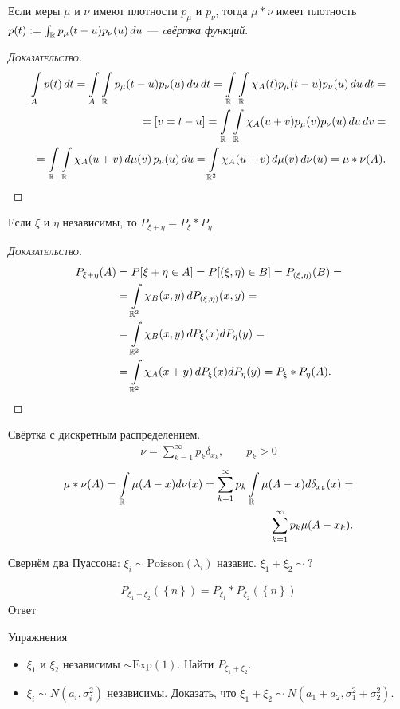 \begin{thm}
 Если меры $ \mu $ и $ \nu $ имеют плотности $ p_{\mu} $ и $ p_{\nu} $, тогда $ \mu \ast \nu $ имеет плотность $ p(t) := \int_{\mathbb{R}} p_{\mu}(t-u)p_{\nu}(u)\,du  $ --- \textit{cвёртка функций}.
\end{thm}
\begin{proof}[\normalfont\textsc{Доказательство}]
 \begin{align*}
  \int\limits_{A} p(t)\,dt = \int\limits_{A} \int\limits_{\mathbb{R}} p_{\mu}(t-u)p_{\nu}(u)\,du\,dt = \int\limits_{\mathbb{R}} \int\limits_{\mathbb{R}} \chi_A(t)p_{\mu} (t-u)p_{\nu}(u)\,du\,dt = \\
  = [v = t - u] = \int\limits_{\mathbb{R}} \int\limits_{\mathbb{R}} \chi_{A}(u+v) p_{\mu}(v) p_{\nu}(u) \, du\,dv = \\
  = \int\limits_{\mathbb{R}} \int\limits_{\mathbb{R}} \chi_A(u+v)\,d\mu(v)\,p_{\nu}(u)\,du = \int\limits_{\mathbb{R}^{2}} \chi_A(u+v)\,d\mu(v)\,d\nu(u) = \mu \ast \nu(A).   
 \end{align*} 
\end{proof}

\begin{thm}
 Если $ \xi $ и $ \eta $ независимы, то $ P_{\xi + \eta} = P_\xi \ast P_\eta $.
\end{thm}
\begin{proof}[\normalfont\textsc{Доказательство}]
 \begin{align*}
  P_{\xi+\eta}(A) &= P[\xi + \eta \in A] = P[(\xi,\eta)\in B] = P_{(\xi,\eta)}(B) = \\
  &= \int\limits_{\mathbb{R}^{2}} \chi_B(x,y) \,dP_{(\xi,\eta)}(x,y) = \\
  &= \int\limits_{\mathbb{R}^{2}} \chi_B(x,y)\,dP_\xi(x)dP_\eta(y) = \\ 
  &= \int\limits_{\mathbb{R}^{2}} \chi_A(x+y) \,dP_\xi(x)dP_\eta(y) = P_{\xi} \ast P_{\eta}(A).
 \end{align*} 
\end{proof}

\begin{exmpl}
 Свёртка с дискретным распределением.
  \begin{align*}
   \nu = \sum_{k=1}^{\infty} p_k \delta_{x_k}, \qquad p_k > 0
 \end{align*} 
 \begin{align*}
  \mu \ast \nu(A) = \int\limits_{\mathbb{R}} \mu(A - x) d\nu(x) = \sum_{k=1}^{\infty} p_k \int\limits_{\mathbb{R}} \mu(A-x) d \delta_{x_k}(x) = \\
  \sum_{k=1}^{\infty}p_k\mu(A-x_k).
 \end{align*} 
\end{exmpl}
\begin{exmpl}
 Свернём два Пуассона: $ \xi_i \sim \mathrm{Poisson}(\lambda_i) $ назавис. $ \xi_1 + \xi_2 \sim ? $

 \begin{align*}
  P_{\xi_1 + \xi_2}(\left\{ n \right\}) = P_{\xi_1} \ast P_{\xi_2}(\left\{ n \right\})
 \end{align*} Ответ 
  
\end{exmpl}

Упражнения

\begin{itemize}
 \item $ \xi_1 $ и $ \xi_2 $ независимы $ \sim \mathrm{Exp}(1)$. Найти $ P_{\xi_1 + \xi_2} $.
 \item $ \xi_i \sim N(a_i,\sigma_i^{2}) $ независимы. Доказать, что $ \xi_1 + \xi_2 \sim N(a_1 + a_2, \sigma_1^{2} + \sigma_2^{2}) $.
\end{itemize}

